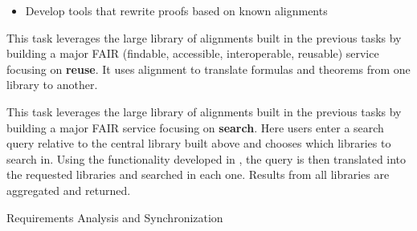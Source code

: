 \begin{workpackage}[id=alignment,wphases=0-48,type=RTD,
  short=Concept Alignment,%
  title=Concept Alignment,
  lead=Pra,
  PraRM=10]
\begin{tasklist}
  \begin{task}[id=alignproofrewrite,title=Alignment based proof rewriting]
    \begin{itemize}
    \item Develop tools that rewrite proofs based on known alignments
    \end{itemize}
  \end{task}

  \begin{task}[id=aligntranslate,title=FAIR Services: Reuse across
    Libraries,lead=Fau,FauRM=12]
    This task leverages the large library of alignments built in the
    previous tasks by building a major FAIR (findable, accessible,
    interoperable, reusable) service focusing on \textbf{reuse}. It
    uses alignment to translate formulas and theorems from one library
    to another.
  \end{task}

  \begin{task}[id=alignsearch,title=FAIR Services: Search across
    Libraries,lead=Fau,FauRM=12]
    This task leverages the large library of alignments built in the
    previous tasks by building a major FAIR service focusing on
    \textbf{search}.  Here users enter a search query relative to the
    central library built above and chooses which libraries to search
    in.  Using the functionality developed in
    , the query is then translated into
    the requested libraries and searched in each one.  Results from
    all libraries are aggregated and returned.
\end{task}

\end{tasklist}

\begin{wpdelivs}
  \begin{wpdeliv}[due=3,miles=startup,id=requirements,dissem=PU,nature=DEM,lead=Inr]
      {Requirements Analysis and Synchronization}
\end{wpdeliv}
\end{wpdelivs}
\end{workpackage}

